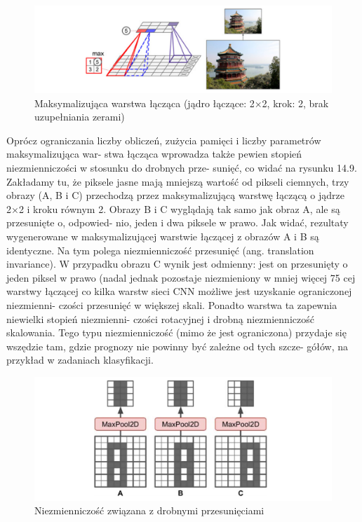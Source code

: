 \documentclass[12pt]{mwbk}
\theoremstyle{plain}
\theoremstyle{definition}
\theoremstyle{remark}
\newcommand\zrodlo[1]{\par\vspace{-3mm}{\small\textit{Źródło: }#1 }}
\begin{document}
\begin{figure}[!h]
	\centering
	\includegraphics[width=\linewidth]{rys/max_pooling_layer.png}
	\caption{Maksymalizująca warstwa łącząca (jądro łączące: 2×2, krok: 2, brak uzupełniania zerami)}
	\zrodlo{\cite{geron}}
	\label{fig:max-pooling-layer}
\end{figure}
Oprócz ograniczania liczby obliczeń, zużycia pamięci i liczby parametrów maksymalizująca war-
stwa łącząca wprowadza także pewien stopień niezmienniczości w stosunku do drobnych prze-
sunięć, co widać na rysunku 14.9. Zakładamy tu, że piksele jasne mają mniejszą wartość od pikseli
ciemnych, trzy obrazy (A, B i C) przechodzą przez maksymalizującą warstwę łączącą o jądrze 2×2
i kroku równym 2. Obrazy B i C wyglądają tak samo jak obraz A, ale są przesunięte o, odpowied-
nio, jeden i dwa piksele w prawo. Jak widać, rezultaty wygenerowane w maksymalizującej warstwie
łączącej z obrazów A i B są identyczne. Na tym polega niezmienniczość przesunięć (ang. translation
invariance). W przypadku obrazu C wynik jest odmienny: jest on przesunięty o jeden piksel w prawo
(nadal jednak pozostaje niezmieniony w mniej więcej 75%
cej warstwy łączącej co kilka warstw sieci CNN możliwe jest uzyskanie ograniczonej niezmienni-
czości przesunięć w większej skali. Ponadto warstwa ta zapewnia niewielki stopień niezmienni-
czości rotacyjnej i drobną niezmienniczość skalowania. Tego typu niezmienniczość (mimo że jest
ograniczona) przydaje się wszędzie tam, gdzie prognozy nie powinny być zależne od tych szcze-
gółów, na przykład w zadaniach klasyfikacji.
\begin{figure}[!h]
	\centering
	\includegraphics[width=\linewidth]{rys/niezmienniczosc_pooling.png}
	\caption{Niezmienniczość związana z drobnymi przesunięciami}
	\zrodlo{\cite{geron}}
	\label{fig:niezmienniczosc-pooling}
\end{figure}
\end{document}
